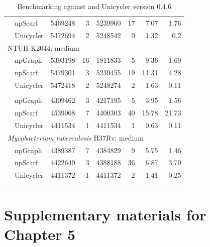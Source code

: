 \begin{longtable}[!hpt]{llcrrrrr}
\rowcolor{Gray}
 & npScarf & 5469248  &  3  &  5239960  &  17  &  7.07 & 1.76\\
\rowcolor{Gray}
& Unicycler & 5472694  &  2  &  5248542  &  0  & 1.32  & 0.2\\
\hline
 \multicolumn{8}{l}{ \kp{} NTUH K2044: medium} \\ %
\hline
 & npGraph & 5393198  &  16  &  1811833  &  5  & 9.36  & 1.69\\
 & npScarf &  5479301 &  3  &  5239455  &  19  &  11.31 & 4.28 \\
& Unicycler &  5472418 &  2  &  5248274  &  2  &  1.63 & 0.11 \\
\hline
\hline  
\rowcolor{Gray}
 \multicolumn{8}{l}{ \emph{Mycobacterium tuberculosis} H37Rv: good} \\ %
\hline
\rowcolor{Gray}
 & npGraph &  4309462 &  3  &  4217195  &   5 & 3.95  & 1.56\\
\rowcolor{Gray}
 & npScarf & 4539068  &  7  &  4400303  &  40  & 15.78  & 21.73\\
\rowcolor{Gray}
& Unicycler &  4411534 & 1  &  4411534  &  1  & 0.63  & 0.11\\
\hline
 \multicolumn{8}{l}{ \emph{Mycobacterium tuberculosis} H37Rv: medium} \\ %
\hline
 & npGraph & 4389387  &  7  &  4384829  &  9  & 5.75  & 1.46\\
 & npScarf &  4422649 &  3  &  4388188  &  36  &  6.87 & 3.70\\
& Unicycler & 4411372  &  1  &  4411372  &  2  & 1.41  & 0.25\\
\hline
\caption{Benchmarking \npgraph{} against \npscarf{} and Unicycler version 0.4.6}
\label{tab:benchmarking}
\end{longtable}

\chapter{Supplementary materials for Chapter 5}\label{app:concatemer}
\newpage

